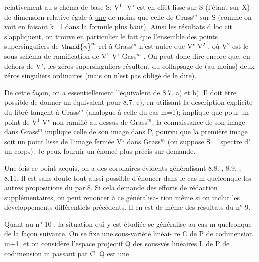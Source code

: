 
relativement  au s chéma de base S:  V$^1$- V"  est en effet lisse sur S
(l'étant sur X)  de dimension relative égale à \uline{une} de moins que celle de
Grass$^m$ sur S  (comme on voit en faisant k=1 dans la formule plus haut).
Ainsi  les résultats d  loc cit  s'appliquent, on trouve en particulier
le fait que l'ensemble des points  supersinguliers  de $\hand{\phi}^m$ rel à Grass$^m$
n'est autre que V" \hand{$\cup$} V$^2$ , où  V$^2$ est le sous-schéma de ramification
de  V$^1$-V" \hand{$\longrightarrow$} Gass$^m$ .  On peut donc dire encore que, en dehors de V", les
zéros supersinguliers résultent du collapsage de (au moins) deux zéros
singuliers ordinaires (mais on  n'est pas obligé de le dire\hand{)}).

\margin{$|$} De cette façon, on a essentiellement l'équivalent de 8.7. a) et b). Il \margin{$+$}
doit être possible de donner un équivalent pour  8.7. c), en  utilisant
la  description explicite du fibré tangent  à Grass$^m$ (analogue à
celle du cas m=1);   implique  que  pour  un point  de  V$^1$-V"  non
ramifié au dessus  de Grass$^m$, la connaissance de son image dans Grass$^m$
implique celle de son image dans P, pourvu que la première image soit un
point lisse de l'image fermée  V$^1$ dans Grass$^m$  (on suppose S = spectre d'
un corps).  Je peux fournir un énoncé  plus précis sur demande.

Une fois ce point acquis,  on a des corollaires évidents généralisant
8.8. , 8.9. , 8.11.   Il est sans doute tout aussi possible d'énoncer dans
le cas m quelconque  les autres propositions du par.8. Si cela demande des
efforts de rédaction  supplémentaires, on peut renoncer à ce généralisa-%
tion\hand{,}  même si on inclut les développements différentiels précédents.
Il en est de même des résultats du n$^o$ 9.

Quant au n$^o$ 10 ,  la situation qui y est étudiée se généralise au
cas m quelconque de la façon suivante. On se fixe une sous-variété linéai-
re C de P  de codimension m+1, et on considère l'espace projectif Q des
sous-vés linéaires L de P de codimension m passant par C. Q est une

